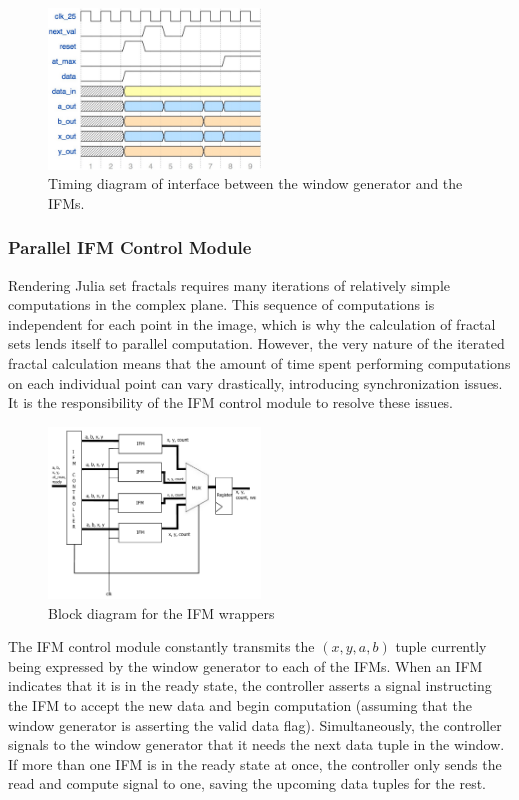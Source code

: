 \documentclass{article}
\begin{document}
\begin{figure}
  \centering
    \includegraphics[width=160pt]{timing_diagrams/gen_ifm.pdf}
  \caption{Timing diagram of interface between the window generator
    and the IFMs.}
\end{figure}

\subsubsection{Parallel IFM Control Module}

Rendering Julia set fractals requires many iterations of relatively
simple computations in the complex plane. This sequence of
computations is independent for each point in the image, which is why
the calculation of fractal sets lends itself to parallel
computation. However, the very nature of the iterated fractal
calculation means that the amount of time spent performing computations on each individual point
can vary drastically, introducing synchronization issues. It is the responsibility of the
IFM control module to resolve these issues.

\begin{figure}
  \centering
    \includegraphics[width=160pt]{block_diagrams/ifmunit.pdf}
  \caption{Block diagram for the IFM wrappers}
\end{figure}


The IFM control module constantly transmits the $(x, y, a, b)$ tuple currently being expressed by the window generator to 
each of the IFMs. When an IFM indicates that it is in the ready state, the controller asserts a signal instructing the 
IFM to accept the new data and begin computation (assuming that the window generator is asserting the valid data flag).
Simultaneously, the controller signals to the window generator that it needs the next data tuple in the window. If more
than one IFM is in the ready state at once, the controller only sends the read and compute signal to one, saving the 
upcoming data tuples for the rest.
\end{document}
